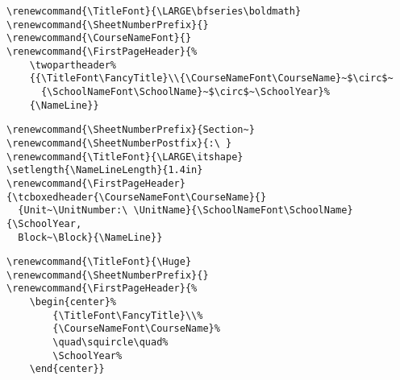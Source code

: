 \documentclass[12pt,twoside,parskip,notitle,showframe]{handout}
\begin{document}
\newpage

\begingroup
\renewcommand{\TitleFont}{\LARGE\bfseries\boldmath}
\renewcommand{\SheetNumberPrefix}{}
\renewcommand{\CourseNameFont}{}
\renewcommand{\FirstPageHeader}{%
	\twopartheader%
	{{\TitleFont\FancyTitle}\\{\CourseNameFont\CourseName}~$\circ$~{\SchoolNameFont\SchoolName}~$\circ$~\SchoolYear}%
	{\NameLine}}
\maketitle
\singlespacing
\begin{verbatim}
\renewcommand{\TitleFont}{\LARGE\bfseries\boldmath}
\renewcommand{\SheetNumberPrefix}{}
\renewcommand{\CourseNameFont}{}
\renewcommand{\FirstPageHeader}{%
    \twopartheader%
    {{\TitleFont\FancyTitle}\\{\CourseNameFont\CourseName}~$\circ$~
      {\SchoolNameFont\SchoolName}~$\circ$~\SchoolYear}%
    {\NameLine}}
\end{verbatim}
\endgroup
\newpage

\begingroup
\renewcommand{\SheetNumberPrefix}{Section~}
\renewcommand{\SheetNumberPostfix}{:\ }
\renewcommand{\TitleFont}{\LARGE\itshape}
\setlength{\NameLineLength}{1.4in}
\renewcommand{\FirstPageHeader}{\tcboxedheader{\CourseNameFont\CourseName}{}{Unit~\UnitNumber:\ \UnitName}{\SchoolNameFont\SchoolName}{\SchoolYear, Block~\Block}{\NameLine}}
\maketitle
\singlespacing
\begin{verbatim}
\renewcommand{\SheetNumberPrefix}{Section~}
\renewcommand{\SheetNumberPostfix}{:\ }
\renewcommand{\TitleFont}{\LARGE\itshape}
\setlength{\NameLineLength}{1.4in}
\renewcommand{\FirstPageHeader}{\tcboxedheader{\CourseNameFont\CourseName}{}
  {Unit~\UnitNumber:\ \UnitName}{\SchoolNameFont\SchoolName}{\SchoolYear, 
  Block~\Block}{\NameLine}}
\end{verbatim}
\endgroup

\newpage

\begingroup
\renewcommand{\TitleFont}{\Huge}
\renewcommand{\SheetNumberPrefix}{}
\renewcommand{\FirstPageHeader}{%
	\begin{center}%
		{\TitleFont\FancyTitle}\\%
		{\CourseNameFont\CourseName}%
		\quad\squircle\quad%
		\SchoolYear%
	\end{center}}
\maketitle
\begin{verbatim}
\renewcommand{\TitleFont}{\Huge}
\renewcommand{\SheetNumberPrefix}{}
\renewcommand{\FirstPageHeader}{%
    \begin{center}%
        {\TitleFont\FancyTitle}\\%
        {\CourseNameFont\CourseName}%
        \quad\squircle\quad%
        \SchoolYear%
    \end{center}}
\end{verbatim}
\endgroup
\end{document}
